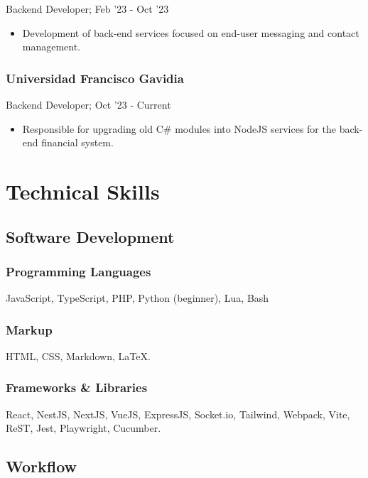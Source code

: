 \documentclass[letterpaper]{article}
\begin{document}
Backend Developer; Feb '23 - Oct '23

\begin{itemize}
  \item Development of back-end services focused on end-user messaging and contact management.
\end{itemize}

\subsubsection{Universidad Francisco Gavidia}

Backend Developer; Oct '23 - Current

\begin{itemize}
  \item Responsible for upgrading old C\# modules into NodeJS services for the back-end financial system.
\end{itemize}

\section{Technical Skills}

\subsection{Software Development}

\subsubsection{Programming Languages}

JavaScript, TypeScript, PHP, Python (beginner), Lua, Bash

\subsubsection{Markup}

HTML, CSS, Markdown, \LaTeX{}.

\subsubsection{Frameworks \& Libraries}

React, NestJS, NextJS, VueJS, ExpressJS, Socket.io, Tailwind, Webpack, Vite, ReST, Jest, Playwright, Cucumber.

\subsection{Workflow}
\end{document}
